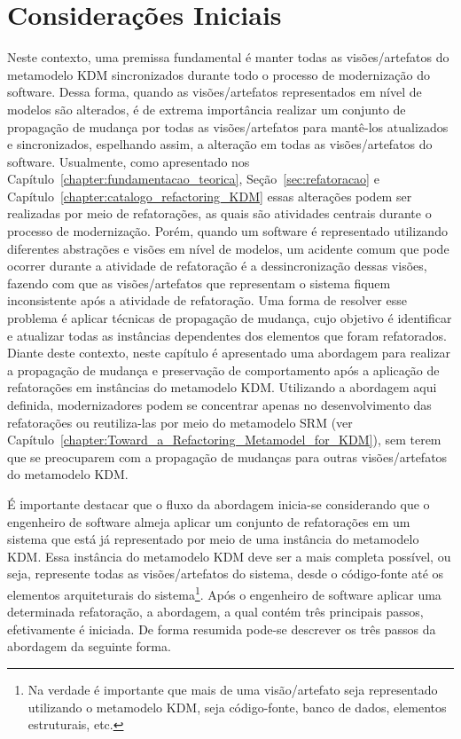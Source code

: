 \section{Considerações Iniciais}


Neste contexto, uma premissa fundamental é manter todas as visões/artefatos do metamodelo KDM sincronizados durante todo o processo de modernização do software. Dessa forma, quando as visões/artefatos representados em nível de modelos são alterados, é de extrema importância realizar um conjunto de propagação de mudança por todas as visões/artefatos para mantê-los atualizados e sincronizados, espelhando assim, a alteração em todas as visões/artefatos do software. Usualmente, como apresentado nos Capítulo~\ref{chapter:fundamentacao_teorica}, Seção~\ref{sec:refatoracao} e Capítulo~\ref{chapter:catalogo_refactoring_KDM} essas alterações podem ser realizadas por meio de refatorações, as quais são atividades centrais durante o processo de modernização. Porém, quando um software é representado utilizando diferentes abstrações e visões em nível de modelos, um acidente comum que pode ocorrer durante a atividade de refatoração é a dessincronização dessas visões, fazendo com que as visões/artefatos que representam o sistema fiquem inconsistente após a atividade de refatoração. Uma forma de resolver esse problema é aplicar técnicas de propagação de mudança, cujo objetivo é identificar e atualizar todas as instâncias dependentes dos elementos que foram refatorados. %
Diante deste contexto, neste capítulo é apresentado uma abordagem para realizar a propagação de mudança e preservação de comportamento após a aplicação de refatorações em instâncias do metamodelo KDM. Utilizando a abordagem aqui definida, modernizadores podem se concentrar apenas no desenvolvimento das refatorações ou reutiliza-las por meio do metamodelo SRM (ver Capítulo~\ref{chapter:Toward_a_Refactoring_Metamodel_for_KDM}), sem terem que se preocuparem com a propagação de mudanças para outras visões/artefatos do metamodelo KDM. 

É importante destacar que o fluxo da abordagem inicia-se considerando que o engenheiro de software almeja aplicar um conjunto de refatorações em um sistema que está já representado por meio de uma instância do metamodelo KDM. Essa instância do metamodelo KDM deve ser a mais completa possível, ou seja, represente todas as visões/artefatos do sistema, desde o código-fonte até os elementos arquiteturais do sistema\footnote{Na verdade é importante que mais de uma visão/artefato seja representado utilizando o metamodelo KDM, seja código-fonte, banco de dados, elementos estruturais, etc.}. Após o engenheiro de software aplicar uma determinada refatoração, a abordagem, a qual contém três principais passos, efetivamente é iniciada. De forma resumida pode-se descrever os três passos da abordagem da seguinte forma. 

